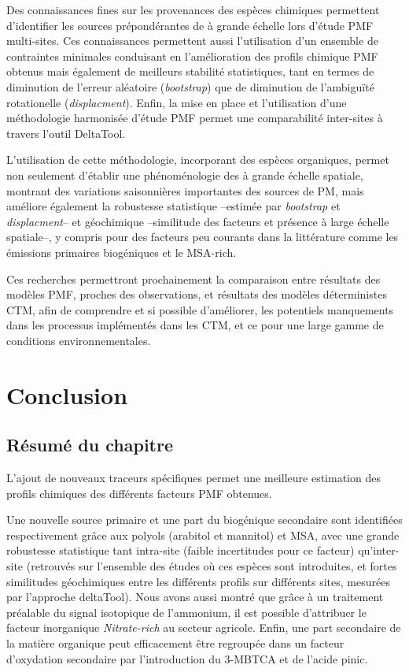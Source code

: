 Des connaissances fines sur les provenances des espèces chimiques permettent d'identifier
les sources prépondérantes de \PMdix{} à grande échelle lors d'étude PMF multi-sites.
Ces connaissances permettent aussi l'utilisation d'un ensemble de contraintes minimales
conduisant en l'amélioration des profils chimique PMF obtenus mais également de meilleurs
stabilité statistiques, tant en termes de diminution de l'erreur aléatoire
(\textit{bootstrap}) que de diminution de l'ambiguïté rotationelle
(\textit{displacment}).  Enfin, la mise en place et l'utilisation d'une méthodologie
harmonisée d'étude PMF permet une comparabilité inter-sites à travers l'outil DeltaTool.

L'utilisation de cette méthodologie, incorporant des espèces organiques, permet non
seulement d'établir une phénoménologie des \PMdix{} à grande échelle spatiale, montrant
des variations saisonnières importantes des sources de PM, mais améliore également la
robustesse statistique --estimée par \textit{bootstrap} et \textit{displacment}-- et
géochimique --similitude des facteurs et présence à large échelle spatiale--, y compris
pour des facteurs peu courants dans la littérature comme les émissions primaires
biogéniques et le MSA-rich.

Ces recherches permettront prochainement la comparaison entre résultats des modèles PMF,
proches des observations, et résultats des modèles déterministes CTM, afin de comprendre
et si possible d'améliorer, les potentiels manquements dans les processus implémentés
dans les CTM, et ce pour une large gamme de conditions environnementales.

\section{Conclusion}%
\label{sec:conclusion_chap3}

\subsection{Résumé du chapitre}%
\label{sub:résumé_du_chapitre_3}

L'ajout de nouveaux traceurs spécifiques permet une meilleure estimation des profils
chimiques des différents facteurs PMF obtenues. 

Une nouvelle source primaire et une part du biogénique secondaire sont identifiées
respectivement grâce aux polyols (arabitol et mannitol) et MSA, avec une grande
robustesse statistique tant intra-site (faible incertitudes pour ce facteur)
qu'inter-site (retrouvés sur l'ensemble des études où ces espèces sont introduites, et
fortes similitudes géochimiques entre les différents profils sur différents sites,
mesurées par l'approche deltaTool).  Nous avons aussi montré que grâce à un traitement
préalable du signal isotopique de l'ammonium, il est possible d'attribuer le facteur
inorganique \textit{Nitrate-rich} au secteur agricole.  Enfin, une part secondaire de la
matière organique peut efficacement être regroupée dans un facteur d'oxydation secondaire
par l'introduction du 3-MBTCA et de l'acide pinic.

